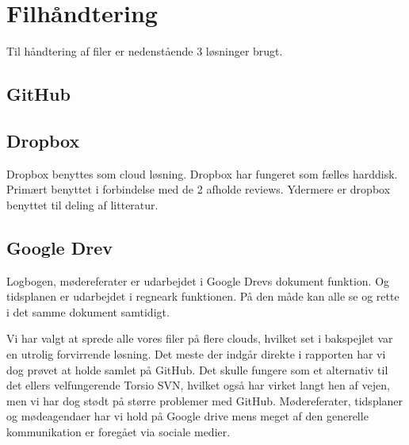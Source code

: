 \section{Filhåndtering}
Til håndtering af filer er nedenstående 3 løsninger brugt. 

\subsection{GitHub}



\subsection{Dropbox}

Dropbox benyttes som cloud løsning. Dropbox har fungeret som fælles harddisk. Primært benyttet i forbindelse med de 2 afholde reviews. Ydermere er dropbox benyttet til deling af litteratur. 

\subsection{Google Drev}

Logbogen, mødereferater er udarbejdet i Google Drevs dokument funktion. Og tidsplanen er udarbejdet i regneark funktionen. På den måde kan alle se og rette i det samme dokument samtidigt. 


Vi har valgt at sprede alle vores filer på flere clouds, hvilket set i bakspejlet var en utrolig forvirrende løsning. 
Det meste der indgår direkte i rapporten har vi dog prøvet at holde samlet på GitHub. Det skulle fungere som et alternativ til det ellers velfungerende Torsio SVN, hvilket også har virket langt hen af vejen, men vi har dog stødt på større problemer med GitHub. 
Mødereferater, tidsplaner og mødeagendaer har vi hold på Google drive mens meget af den generelle kommunikation er foregået via sociale medier. 


